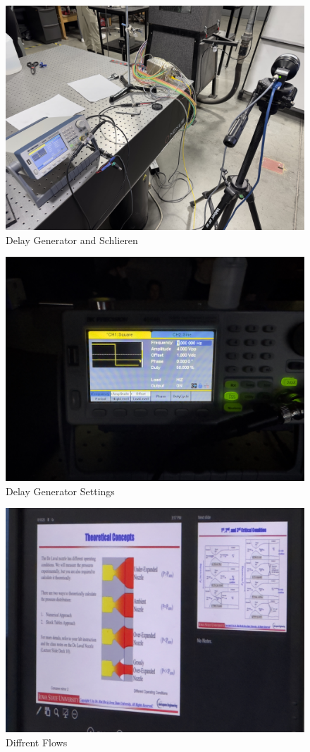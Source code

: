 \begin{figure}[htpb]
    \centering
    \includegraphics[width=0.75\linewidth]{Figures/delay_generator_and_schlieren.jpeg}
    \caption[Delay Generator and Schlieren]{Delay Generator and Schlieren}
    \label{fig: delayGeneratoandSchlieren}
\end{figure}

\begin{figure}[htpb]
    \centering
    \includegraphics[width=0.75\linewidth]{Figures/delay_generator_settings.jpeg}
    \caption[Delay Generator Settings]{Delay Generator Settings}
    \label{fig: delayGeneratorsettings}
\end{figure}

\begin{figure}[htpb]
    \centering
    \includegraphics[width=0.75\linewidth]{Figures/different_flows.jpeg}
    \caption[Different Flows]{Diffrent Flows}
    \label{fig: DiffrentFlows}
\end{figure}

